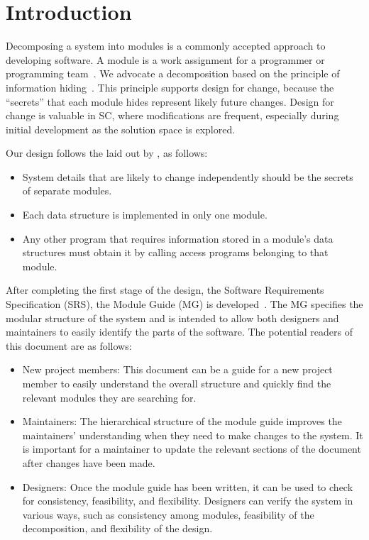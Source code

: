 \documentclass[12pt, titlepage]{article}
\begin{document}
\newpage

\tableofcontents

\listoftables

\listoffigures

\newpage


\section{Introduction}

Decomposing a system into modules is a commonly accepted approach to developing
software.  A module is a work assignment for a programmer or programming
team~\citep{ParnasEtAl1984}.  We advocate a decomposition
based on the principle of information hiding~\citep{Parnas1972a}.  This
principle supports design for change, because the ``secrets'' that each module
hides represent likely future changes.  Design for change is valuable in SC,
where modifications are frequent, especially during initial development as the
solution space is explored.  

Our design follows the laid out by \citet{ParnasEtAl1984}, as follows:
\begin{itemize}
\item System details that are likely to change independently should be the
  secrets of separate modules.
\item Each data structure is implemented in only one module.
\item Any other program that requires information stored in a module's data
  structures must obtain it by calling access programs belonging to that module.
\end{itemize}

After completing the first stage of the design, the Software Requirements
Specification (SRS), the Module Guide (MG) is developed~\citep{ParnasEtAl1984}. The MG
specifies the modular structure of the system and is intended to allow both
designers and maintainers to easily identify the parts of the software.  The
potential readers of this document are as follows:

\begin{itemize}
\item New project members: This document can be a guide for a new project member
  to easily understand the overall structure and quickly find the
  relevant modules they are searching for.
\item Maintainers: The hierarchical structure of the module guide improves the
  maintainers' understanding when they need to make changes to the system. It is
  important for a maintainer to update the relevant sections of the document
  after changes have been made.
\item Designers: Once the module guide has been written, it can be used to
  check for consistency, feasibility, and flexibility. Designers can verify the
  system in various ways, such as consistency among modules, feasibility of the
  decomposition, and flexibility of the design.
\end{itemize}
\end{document}
